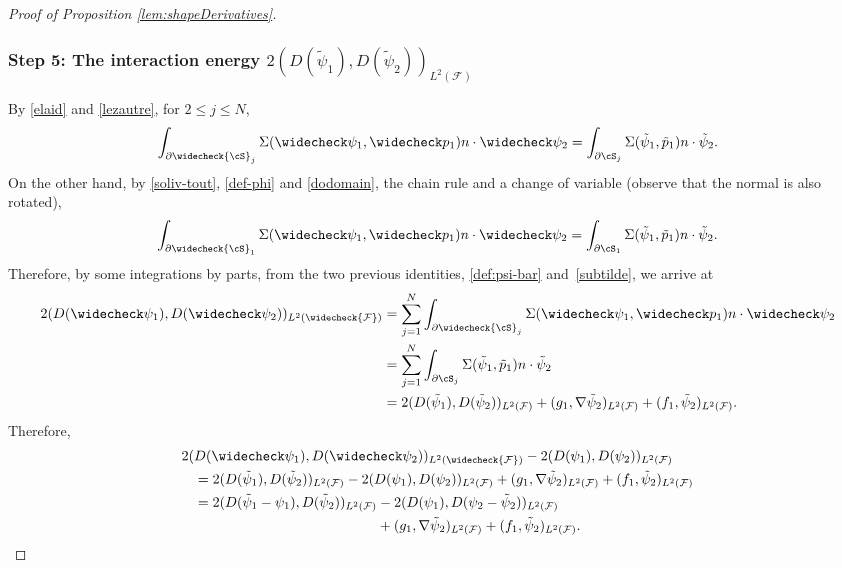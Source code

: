 \begin{proof}[Proof of Proposition \ref{lem:shapeDerivatives}]
\subsubsection*{Step 5: The interaction energy $2(D(\tilde \psi_1), D(\tilde \psi_2))_{L^2(\mathcal F)}$}
By \eqref{elaid} and \eqref{lezautre}, for \hbox{$2\leq j \leq N$},
\begin{equation*}
\int_{\partial \widecheck{\cS}_j}
\Sigma(\widecheck \psi_1,\widecheck p_1) n \cdot \widecheck \psi_2 =
\int_{\partial {\cS}_j}
\Sigma(\tilde \psi_1,\tilde p_1) n \cdot \tilde \psi_2.
\end{equation*}
On the other hand, by \eqref{soliv-tout},
\eqref{def-phi} and
\eqref{dodomain}, the chain rule and a change of variable (observe that the normal is also rotated),
\begin{equation*}
\int_{\partial \widecheck{\cS}_1}
\Sigma(\widecheck \psi_1,\widecheck p_1) n \cdot \widecheck \psi_2 =
\int_{\partial {\cS}_1}
\Sigma(\tilde \psi_1,\tilde p_1) n \cdot \tilde \psi_2.
\end{equation*}
Therefore, by some integrations by parts,
from the two previous identities, \eqref{def:psi-bar} and~\eqref{subtilde}, we arrive at
\begin{align*}
2(D(\widecheck \psi_1), D(\widecheck \psi_2))_{L^2(\widecheck{\mathcal F})}
&= \sum_{j=1}^N \int_{\partial \widecheck{\cS}_j}
\Sigma(\widecheck \psi_1,\widecheck p_1) n \cdot \widecheck \psi_2 \\
&= \sum_{j=1}^N \int_{\partial {\cS}_j}
\Sigma(\tilde \psi_1,\tilde p_1) n \cdot \tilde \psi_2 \\
&= 2(D(\tilde \psi_1), D(\tilde \psi_2))_{L^2(\mathcal F)}
+ (g_1, \nabla \tilde \psi_2)_{L^2(\mathcal F)} + (f_1, \tilde \psi_2)_{L^2(\mathcal F)}.
\end{align*}
Therefore,
\begin{align*}
2(&D(\widecheck \psi_1), D(\widecheck \psi_2))_{L^2(\widecheck{\mathcal F})} - 2(D(\psi_1), D(\psi_2))_{L^2(\mathcal F)}\\
&= 2(D(\tilde \psi_1), D(\tilde \psi_2))_{L^2(\mathcal F)} - 2(D(\psi_1), D(\psi_2))_{L^2(\mathcal F)} + (g_1, \nabla \tilde \psi_2)_{L^2(\mathcal F)} + (f_1, \tilde \psi_2)_{L^2(\mathcal F)}\\
&= 2(D(\tilde \psi_1 - \psi_1), D(\tilde \psi_2))_{L^2(\mathcal F)} - 2(D(\psi_1), D(\psi_2-\tilde \psi_2))_{L^2(\mathcal F)} \\
&\hspace*{4.6cm}+ (g_1, \nabla \tilde \psi_2)_{L^2(\mathcal F)} + (f_1, \tilde \psi_2)_{L^2(\mathcal F)}.

\end{align*}
\end{proof}
